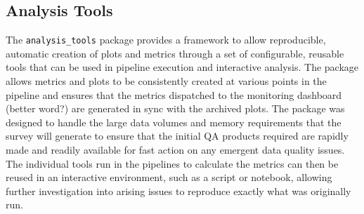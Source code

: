\subsection{Analysis Tools}

The \texttt{analysis\_tools} package provides a framework to allow reproducible, automatic creation of plots and metrics through a set of configurable, reusable tools that can be used in pipeline execution and interactive analysis.
The package allows metrics and plots to be consistently created at various points in the pipeline and ensures that the metrics dispatched to the monitoring dashboard (better word?) are generated in sync with the archived plots.
The package was designed to handle the large data volumes and memory requirements that the survey will generate to ensure that the initial QA products required are rapidly made and readily available for fast action on any emergent data quality issues.
The individual tools run in the pipelines to calculate the metrics can then be reused in an interactive environment, such as a script or notebook, allowing further investigation into arising issues to reproduce exactly what was originally run.

